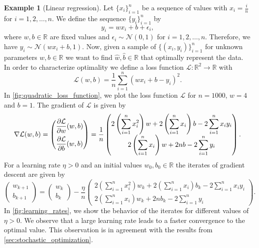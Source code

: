 \documentclass[12pt]{article}
\theoremstyle{definition}
\newtheorem{example}[example]{Example}
\numberwithin{equation}{section}
\newcommand{\R}{\mathbb{R}}
\newcommand{\CL}{\mathcal{L}}
\newcommand{\CN}{\mathcal{N}}
\begin{document}
\begin{example}[Linear regression]
  \label{ex:linear_regression}
  Let $\{x_i\}_{i=1}^n$ be a sequence of values with $x_i = \frac{i}{n}$ for $i = 1,2,\dots,n$. We define the sequence $\{y_i\}_{i=1}^n$ by
  \begin{equation*}
    y_i = wx_i + b + \epsilon_i,
  \end{equation*}
  where $w,b \in \R$ are fixed values and $\epsilon_i \sim \CN(0,1)$ for $i = 1, 2, \dots, n$. Therefore, we have $y_i \sim \CN(wx_i + b,1)$.
  Now, given a sample of $\{(x_i, y_i)\}_{i=1}^n$ for unknown parameters $w, b \in \R$ we want to find $\hat{w}, \hat{b} \in \R$ that optimally represent the data. In order to characterize optimality we define a loss function $\CL : \R^2 \rightarrow \R$ with 
  \begin{equation}
    \CL (w, b) = \frac{1}{n} \sum_{i=1}^n(wx_i + b  - y_i)^2.
  \end{equation}
  In \autoref{fig:quadratic_loss_function}, we plot the loss function $\CL$ for $n = 1000$, $w=4$ and $b=1$. The gradient of $\CL$ is given by
  \[
    \nabla \CL (w,b) = 
    \begin{pmatrix}
      \displaystyle\frac{\partial \CL}{\partial w}(w,b) \\
      \addlinespace
      \displaystyle\frac{\partial \CL}{\partial b}(w,b) 
    \end{pmatrix}
    = \frac{1}{n}
    \begin{pmatrix}
      2\left(\displaystyle\sum_{i=1}^n x_i^2\right)w + 2 \left(\displaystyle\sum_{i=1}^n x_i\right)b - 2 \displaystyle\sum_{i=1}^n x_i y_i \\
      2 \left(\displaystyle\sum_{i=1}^n x_i\right) w + 2nb - 2 \displaystyle\sum_{i=1}^n y_i
    \end{pmatrix}.
  \]
  For a learning rate $\eta > 0$ and an initial values $w_{0},b_0 \in \R$ the iterates of gradient descent are given by
  \begin{equation*}
    \begin{pmatrix}
      w_{k+1} \\
      b_{k+1}
    \end{pmatrix}
    =
    \begin{pmatrix}
      w_{k} \\
      b_k
    \end{pmatrix}
    - \frac{\eta}{n}
    \begin{pmatrix}
      2\left(\displaystyle\sum_{i=1}^n x_i^2\right)w_k + 2 \left(\displaystyle\sum_{i=1}^n x_i\right)b_k - 2 \displaystyle\sum_{i=1}^n x_i y_i \\
      2 \left(\displaystyle\sum_{i=1}^n x_i\right) w_k + 2nb_k - 2 \displaystyle\sum_{i=1}^n y_i
    \end{pmatrix}.
  \end{equation*}
  In \autoref{fig:learning_rates}, we show the behavior of the iterates for different values of $\eta >0$. We observe that a large learning rate leads to a faster convergence to the optimal value. This observation is in agreement with the results from \autoref{sec:stochastic_optimization}.


\end{example}
\end{document}
